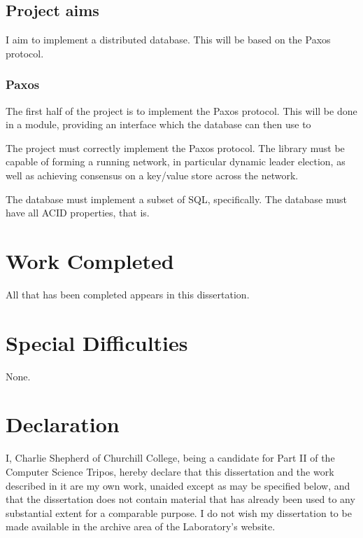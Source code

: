 \documentclass[12pt,twoside,notitlepage]{report}
\begin{document}
\subsection*{Project aims}

I aim to implement a distributed database. This will be based on the Paxos protocol.

\subsubsection*{Paxos}

The first half of the project is to implement the Paxos protocol. This will be done in a module,
providing an interface which the database can then use to

The project must correctly implement the Paxos protocol.  The library must be capable of forming a
running network, in particular dynamic leader election, as well as achieving consensus on a
key/value store across the network.

The database must implement a subset of SQL, specifically. The database must have all ACID
properties, that is.

\section*{Work Completed}

All that has been completed appears in this dissertation.

\section*{Special Difficulties}

None.

\newpage
\section*{Declaration}

I, Charlie Shepherd of Churchill College, being a candidate for Part II of the Computer Science
Tripos, hereby declare that this dissertation and the work described in it are my own work,
unaided except as may be specified below, and that the dissertation does not contain material that
has already been used to any substantial extent for a comparable purpose.
I do not wish my dissertation to be made available in the archive area of
the Laboratory's website.

\bigskip
{}
\end{document}
